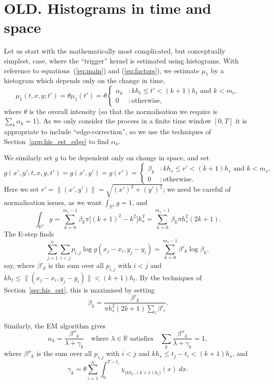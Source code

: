 \documentclass[twoside,a4paper]{article}
\theoremstyle{plain}
\theoremstyle{definition}
\begin{document}
\section{OLD.  Histograms in time and space}

Let us start with the mathematically most complicated, but conceptually simplest,
case, where the ``trigger'' kernel is estimated using histograms.  With reference
to equations~(\ref{eq:main}) and (\ref{eq:factors}), we estimate $\mu_1$ by a
histogram which depends only on the change in time,
\[ \mu_1(t,x,y;t') = \theta \mu_1(t') = \theta \begin{cases}
\alpha_k &: kh_t \leq t' < (k+1)h_t \text{ and } k < m_t, \\
0 &: \text{otherwise},
\end{cases} \]
where $\theta$ is the overall intensity (so that the normalisation we require
is $\sum_k \alpha_k=1$).  As we only consider the process in a finite time window
$[0,T]$ it is appropriate to include ``edge-correction'', so we use the techniques
of Section~\ref{app:his_est_edge} to find $\alpha_k$.

We similarly set $g$ to be dependent only on change in space, and set
\[ g(x',y';t,x,y,t') = g(x',y') = g(r') = 
\begin{cases}
\beta_k &: kh_s \leq r' < (k+1)h_s \text{ and } k < m_s, \\
0 &: \text{otherwise}.
\end{cases} \]
Here we set $r' = \|(x',y')\| = \sqrt{(x')^2 + (y')^2}$;
we need be careful of normalisation
issues, as we want $\int_{\mathbb R^2} g = 1$, and
\[ \int_{\mathbb R^2} g = \sum_{k=0}^{m_s-1} \beta_k \pi\big[
(k+1)^2 - k^2 \big] h_s^2
= \sum_{k=0}^{m_s-1} \beta_k \pi h_s^2 (2k+1). \]
The E-step finds
\[ \sum_{j=1}^n \sum_{i<j} p_{i,j} \log g(x_j-x_i, y_j-y_i)
= \sum_{k=0}^{m_s-1} \beta'_k \log \beta_k, \]
say, where $\beta'_k$ is the sum over all $p_{i,j}$ with $i<j$ and
$kh_t \leq \|(x_j-x_i, y_j-y_i)\| < (k+1)h_t$.
By the techniques of Section~\ref{sec:his_est}, this is maximised by setting
\[ \beta_k = \frac{\beta'_k}{\pi h_s^2 (2k+1) \sum_i \beta'_i}. \]

Similarly, the EM algorithm gives
\[ \alpha_k = \frac{\beta''_k}{\lambda + \gamma_k}
\quad\text{where $\lambda\in\mathbb R$ satisfies}\quad \sum_k \frac{\beta''_k}{\lambda + \gamma_k} = 1, \]
where $\beta''_k$ is the sum over all $p_{i,j}$ with $i<j$ and
$kh_s \leq t_j-t_i < (k+1)h_s$, and 
\[ \gamma_k = \theta \sum_{i=1}^n \int_0^{T-t_i}
\chi_{[kh_t,(k+1)h_t)}(x) \ dx. \]
\end{document}
